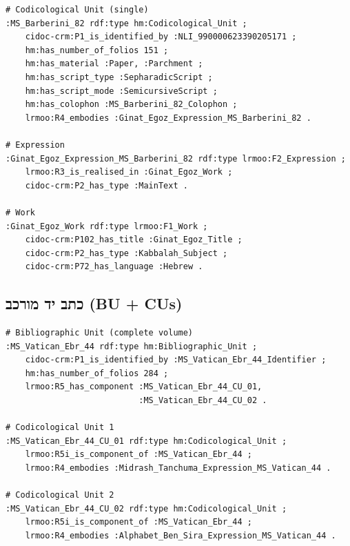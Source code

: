 \begin{LTR}
\begin{verbatim}
# Codicological Unit (single)
:MS_Barberini_82 rdf:type hm:Codicological_Unit ;
    cidoc-crm:P1_is_identified_by :NLI_990000623390205171 ;
    hm:has_number_of_folios 151 ;
    hm:has_material :Paper, :Parchment ;
    hm:has_script_type :SepharadicScript ;
    hm:has_script_mode :SemicursiveScript ;
    hm:has_colophon :MS_Barberini_82_Colophon ;
    lrmoo:R4_embodies :Ginat_Egoz_Expression_MS_Barberini_82 .

# Expression
:Ginat_Egoz_Expression_MS_Barberini_82 rdf:type lrmoo:F2_Expression ;
    lrmoo:R3_is_realised_in :Ginat_Egoz_Work ;
    cidoc-crm:P2_has_type :MainText .

# Work
:Ginat_Egoz_Work rdf:type lrmoo:F1_Work ;
    cidoc-crm:P102_has_title :Ginat_Egoz_Title ;
    cidoc-crm:P2_has_type :Kabbalah_Subject ;
    cidoc-crm:P72_has_language :Hebrew .
\end{verbatim}
\end{LTR}

\subsection{כתב יד מורכב \textenglish{(BU + CUs)}}

\begin{LTR}
\begin{verbatim}
# Bibliographic Unit (complete volume)
:MS_Vatican_Ebr_44 rdf:type hm:Bibliographic_Unit ;
    cidoc-crm:P1_is_identified_by :MS_Vatican_Ebr_44_Identifier ;
    hm:has_number_of_folios 284 ;
    lrmoo:R5_has_component :MS_Vatican_Ebr_44_CU_01, 
                           :MS_Vatican_Ebr_44_CU_02 .

# Codicological Unit 1
:MS_Vatican_Ebr_44_CU_01 rdf:type hm:Codicological_Unit ;
    lrmoo:R5i_is_component_of :MS_Vatican_Ebr_44 ;
    lrmoo:R4_embodies :Midrash_Tanchuma_Expression_MS_Vatican_44 .

# Codicological Unit 2
:MS_Vatican_Ebr_44_CU_02 rdf:type hm:Codicological_Unit ;
    lrmoo:R5i_is_component_of :MS_Vatican_Ebr_44 ;
    lrmoo:R4_embodies :Alphabet_Ben_Sira_Expression_MS_Vatican_44 .
\end{verbatim}
\end{LTR}

